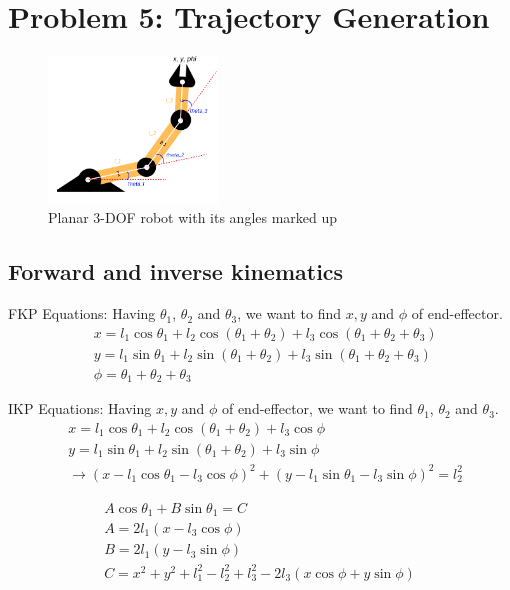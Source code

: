 \documentclass[conference]{IEEEtran}
\begin{document}
\section{Problem 5: Trajectory Generation}
\begin{figure}[H]
    \centerline{\includegraphics[width=0.4\textwidth]{figures/prob5.png}}
    \caption{Planar 3-DOF robot with its angles marked up}
    \label{fig:prob5}
\end{figure}

\subsection{Forward and inverse kinematics}
FKP Equations: Having $\theta_1$, $\theta_2$ and $\theta_3$, we want to find $x, y$ and $\phi$ of end-effector.
\begin{align}
     & x     = l_1 \cos \theta_1 + l_2 \cos (\theta_1 + \theta_2) + l_3 \cos (\theta_1 + \theta_2 + \theta_3) \\
     & y    = l_1 \sin \theta_1 + l_2 \sin (\theta_1 + \theta_2) + l_3 \sin (\theta_1 + \theta_2 + \theta_3)  \\
     & \phi  = \theta_1 + \theta_2 + \theta_3
\end{align}

IKP Equations: Having $x, y$ and $\phi$ of end-effector, we want to find $\theta_1$, $\theta_2$ and $\theta_3$.
\begin{align*}
     & x            = l_1 \cos \theta_1 + l_2 \cos (\theta_1 + \theta_2) + l_3 \cos \phi                         \\
     & y            = l_1 \sin \theta_1 + l_2 \sin (\theta_1 + \theta_2) + l_3 \sin \phi                         \\
     & \rightarrow (x - l_1 \cos \theta_1 - l_3 \cos \phi)^2 + (y - l_1 \sin \theta_1 - l_3 \sin \phi)^2 = l_2^2
\end{align*}

\begin{gather}
    A \cos \theta_1 + B \sin \theta_1 = C \label{eq:IKP} \\
    A = 2 l_1 (x - l_3 \cos \phi)         \\
    B = 2 l_1 (y - l_3 \sin \phi)         \\
    C = x^2 + y^2 + l_1^2 - l_2^2 + l_3^2 - 2 l_3 (x \cos \phi + y \sin \phi)
\end{gather}
\end{document}
